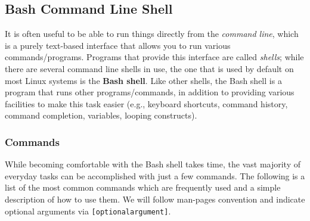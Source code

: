 \documentclass[12pt]{article}
\begin{document}
\subsection{Bash Command Line Shell}
It is often useful to be able to run things directly from the \emph{command line}, which is a purely text-based interface that allows you to run various commands/programs. Programs that provide this interface are called \emph{shells}; while there are several command line shells in use, the one that is used by default on most Linux systems is the \textbf{Bash shell}. Like other shells, the Bash shell is a program that runs other programs/commands, in addition to providing various facilities to make this task easier (e.g., keyboard shortcuts, command history, command completion, variables, looping constructs).

\subsubsection{Commands} \label{sec:bashcmd}
While becoming comfortable with the Bash shell takes time, the vast majority of everyday tasks can be accomplished with just a few commands. The following is a list of the most common commands which are frequently used and a simple description of how to use them. We will follow man-pages convention and indicate optional arguments via \texttt{[optional\ttul argument]}.
\end{document}
